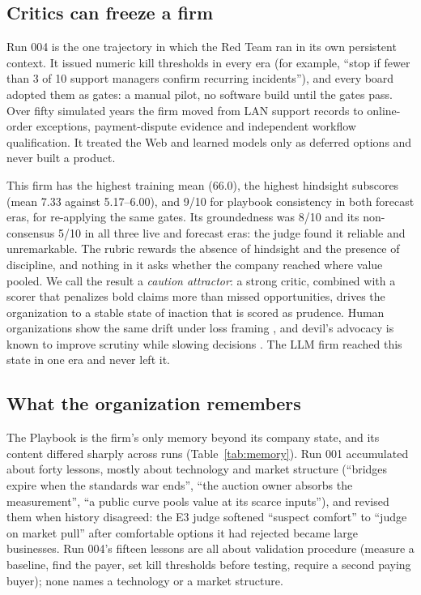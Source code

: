 \documentclass[11pt]{article}
\theoremstyle{definition}
\begin{document}
\subsection{Critics can freeze a firm}
\label{sec:caution}

Run 004 is the one trajectory in which the Red Team ran in its own persistent context. It issued numeric kill thresholds in every era (for example, ``stop if fewer than 3 of 10 support managers confirm recurring incidents''), and every board adopted them as gates: a manual pilot, no software build until the gates pass. Over fifty simulated years the firm moved from LAN support records to online-order exceptions, payment-dispute evidence and independent workflow qualification. It treated the Web and learned models only as deferred options and never built a product.

This firm has the highest training mean (66.0), the highest hindsight subscores (mean 7.33 against 5.17--6.00), and 9/10 for playbook consistency in both forecast eras, for re-applying the same gates. Its groundedness was 8/10 and its non-consensus 5/10 in all three live and forecast eras: the judge found it reliable and unremarkable. The rubric rewards the absence of hindsight and the presence of discipline, and nothing in it asks whether the company reached where value pooled. We call the result a \emph{caution attractor}: a strong critic, combined with a scorer that penalizes bold claims more than missed opportunities, drives the organization to a stable state of inaction that is scored as prudence. Human organizations show the same drift under loss framing \citep{kahneman1993timid}, and devil's advocacy is known to improve scrutiny while slowing decisions \citep{schwenk1990devils}. The LLM firm reached this state in one era and never left it.

\subsection{What the organization remembers}
\label{sec:memory}

The Playbook is the firm's only memory beyond its company state, and its content differed sharply across runs (Table~\ref{tab:memory}). Run 001 accumulated about forty lessons, mostly about technology and market structure (``bridges expire when the standards war ends'', ``the auction owner absorbs the measurement'', ``a public curve pools value at its scarce inputs''), and revised them when history disagreed: the E3 judge softened ``suspect comfort'' to ``judge on market pull'' after comfortable options it had rejected became large businesses. Run 004's fifteen lessons are all about validation procedure (measure a baseline, find the payer, set kill thresholds before testing, require a second paying buyer); none names a technology or a market structure.
\end{document}
